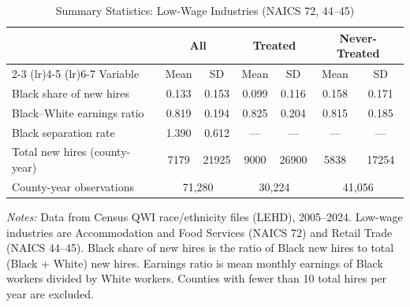 
\begin{table}[H]
\centering
\caption{Summary Statistics: Low-Wage Industries (NAICS 72, 44--45)}
\label{tab:summary}
\begin{threeparttable}
\begin{tabular}{lcccccc}
\toprule
 & \multicolumn{2}{c}{All} & \multicolumn{2}{c}{Treated} & \multicolumn{2}{c}{Never-Treated} \\
\cmidrule(lr){2-3} \cmidrule(lr){4-5} \cmidrule(lr){6-7}
Variable & Mean & SD & Mean & SD & Mean & SD \\
\midrule
Black share of new hires & 0.133 & 0.153 & 0.099 & 0.116 & 0.158 & 0.171 \\
Black--White earnings ratio & 0.819 & 0.194 & 0.825 & 0.204 & 0.815 & 0.185 \\
Black separation rate & 1.390 & 0.612 & --- & --- & --- & --- \\
Total new hires (county-year) & 7179 & 21925 & 9000 & 26900 & 5838 & 17254 \\
\midrule
County-year observations & \multicolumn{2}{c}{71,280} & \multicolumn{2}{c}{30,224} & \multicolumn{2}{c}{41,056} \\
\bottomrule
\end{tabular}
\begin{tablenotes}[flushleft]
\small
\item \textit{Notes:} Data from Census QWI race/ethnicity files (LEHD), 2005--2024. Low-wage industries are Accommodation and Food Services (NAICS 72) and Retail Trade (NAICS 44--45). Black share of new hires is the ratio of Black new hires to total (Black + White) new hires. Earnings ratio is mean monthly earnings of Black workers divided by White workers. Counties with fewer than 10 total hires per year are excluded.
\end{tablenotes}
\end{threeparttable}
\end{table}

